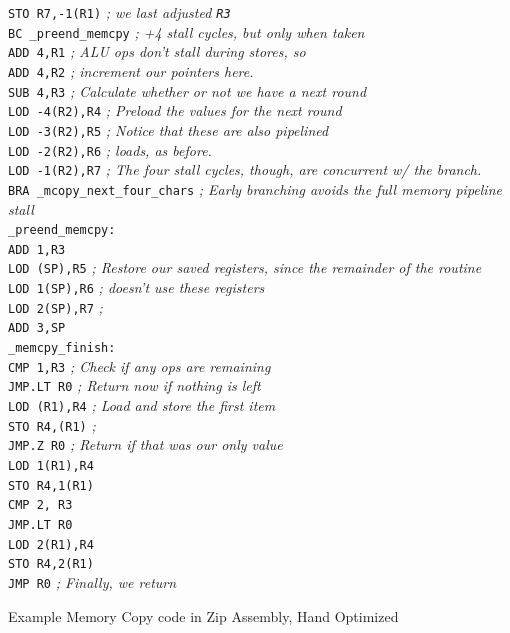 \documentclass{gqtekspec}
\begin{document}
\begin{table}
\begin{center}
{{\begin{tabbing}
\>	{\tt STO  R7,-1(R1)}	\> {\em ; we last adjusted {\tt R3}}\\
\>	{\tt BC  \_preend\_memcpy} \> {\em ; +4 stall cycles, but only when taken}\\
\>	{\tt ADD  4,R1}	\> {\em ; ALU ops don't stall during stores, so}\\
\>	{\tt ADD  4,R2}	\> {\em ; increment our pointers here.} \\
\>	{\tt SUB  4,R3} \> {\em ; Calculate whether or not we have a next round}\\
\>	{\tt LOD  -4(R2),R4} \>	{\em ; Preload the values for the next round}\\
\>	{\tt LOD  -3(R2),R5}\>	{\em ; Notice that these are also pipelined}\\
\>	{\tt LOD  -2(R2),R6}\>	{\em ; loads, as before.}\\
\>	{\tt LOD  -1(R2),R7}\>  {\em ; The four stall cycles, though, are concurrent w/ the branch.}\\
\>	{\tt BRA  \_mcopy\_next\_four\_chars} \> {\em ; Early branching avoids the full memory pipeline stall} \\
{\tt \_preend\_memcpy:}\\
\>	{\tt ADD  1,R3}	\\
\>	{\tt LOD (SP),R5}  \> {\em ; Restore our saved registers, since the remainder of the routine}\\
\>	{\tt LOD 1(SP),R6} \> {\em ; doesn't use these registers}\\
\>	{\tt LOD 2(SP),R7} \> {\em ;}\\
\>	{\tt ADD 3,SP}	\\
{\tt \_memcpy\_finish:}\>\\
\>	{\tt CMP 1,R3} \> {\em ; Check if any ops are remaining }\\
\>	{\tt JMP.LT R0} \> {\em ; Return now if nothing is left}\\
\>	{\tt LOD (R1),R4} \> {\em ; Load and store the first item}\\
\>	{\tt STO R4,(R1)} \> {\em ;}\\
\>	{\tt JMP.Z R0}	\> {\em ; Return if that was our only value}\\
\>	{\tt LOD 1(R1),R4} \\
\>	{\tt STO R4,1(R1)}\\
\>	{\tt CMP 2, R3}\\
\>	{\tt JMP.LT R0}\\
\>	{\tt LOD 2(R1),R4} \\
\>	{\tt STO R4,2(R1)}\\
\>	{\tt JMP     R0} \> {\em ; Finally, we return}\\
\end{tabbing}}}
\caption{Example Memory Copy code in Zip Assembly, Hand Optimized}\label{tbl:memcp-opt}
\end{center}\end{table}
\end{document}
